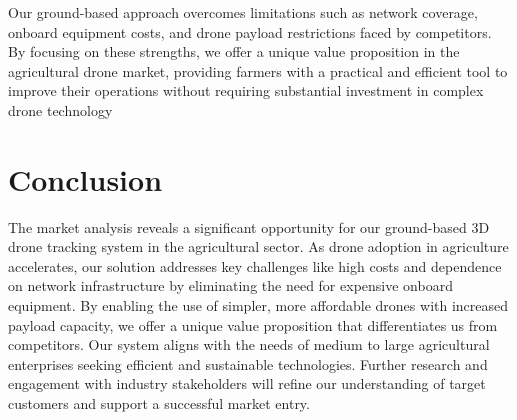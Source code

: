 Our ground-based approach overcomes limitations such as network coverage, onboard equipment costs, and drone payload restrictions faced by competitors. By focusing on these strengths, we offer a unique value proposition in the agricultural drone market, providing farmers with a practical and efficient tool to improve their operations without requiring substantial investment in complex drone technology


\section{Conclusion}

The market analysis reveals a significant opportunity for our ground-based 3D drone tracking system in the agricultural sector. As drone adoption in agriculture accelerates, our solution addresses key challenges like high costs and dependence on network infrastructure by eliminating the need for expensive onboard equipment. By enabling the use of simpler, more affordable drones with increased payload capacity, we offer a unique value proposition that differentiates us from competitors. Our system aligns with the needs of medium to large agricultural enterprises seeking efficient and sustainable technologies. Further research and engagement with industry stakeholders will refine our understanding of target customers and support a successful market entry.